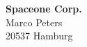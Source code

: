 
                        \textbf{Spaceone Corp.} \\
                        Marco Peters \\
                        20537 Hamburg
                        